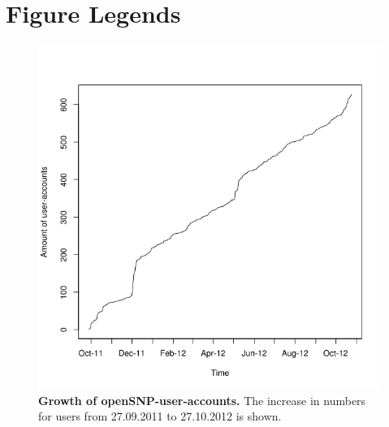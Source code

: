 \documentclass[10pt]{article}
\begin{document}
\section*{Figure Legends}
\begin{figure}[!ht]
	\begin{center}
		\includegraphics[scale=0.35]{25_10_2012_Graphs/users.tif}
	\end{center}
	\caption{
	{\bf Growth of openSNP-user-accounts.} The increase in numbers for users from 27.09.2011 to 27.10.2012 is shown.} 
	\label{Figure1_label}
\end{figure}
\end{document}
